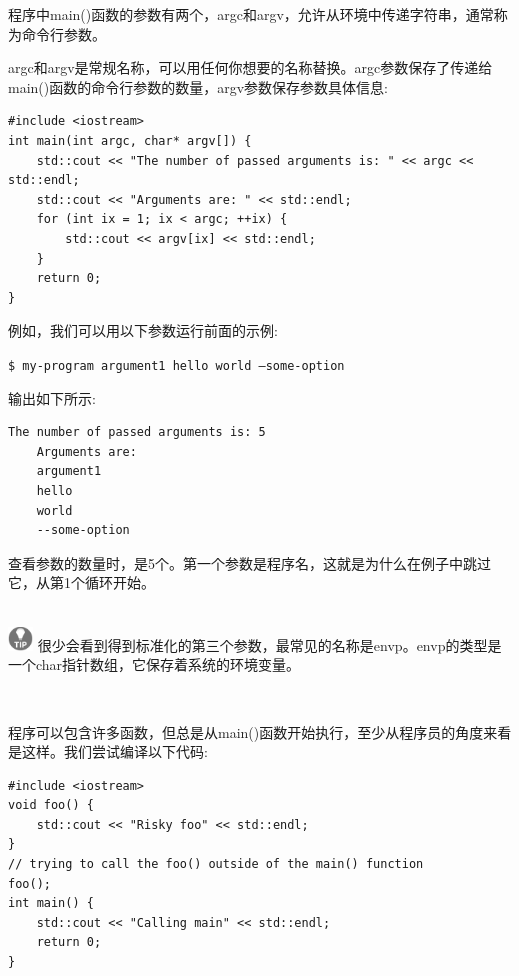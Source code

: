 程序中main()函数的参数有两个，argc和argv，允许从环境中传递字符串，通常称为命令行参数。 \par
argc和argv是常规名称，可以用任何你想要的名称替换。argc参数保存了传递给main()函数的命令行参数的数量，argv参数保存参数具体信息: \par

\begin{lstlisting}[caption={}]
#include <iostream>
int main(int argc, char* argv[]) {
	std::cout << "The number of passed arguments is: " << argc << std::endl;
	std::cout << "Arguments are: " << std::endl;
	for (int ix = 1; ix < argc; ++ix) {
		std::cout << argv[ix] << std::endl;
	}
	return 0;
}
\end{lstlisting}

例如，我们可以用以下参数运行前面的示例: \par

\texttt{\$ my-program argument1 hello world --some-option}

输出如下所示:

\begin{lstlisting}[caption={}]
	The number of passed arguments is: 5 
	Arguments are: 
	argument1 
	hello 
	world 
	--some-option 
\end{lstlisting}

查看参数的数量时，是5个。第一个参数是程序名，这就是为什么在例子中跳过它，从第1个循环开始。 \par

\hspace*{\fill} \\ %
\includegraphics[width=0.05\textwidth]{images/tip}
很少会看到得到标准化的第三个参数，最常见的名称是envp。envp的类型是一个char指针数组，它保存着系统的环境变量。 \par

\noindent\textbf{}\ \par
程序可以包含许多函数，但总是从main()函数开始执行，至少从程序员的角度来看是这样。我们尝试编译以下代码: \par

\begin{lstlisting}[caption={}]
#include <iostream>
void foo() {
	std::cout << "Risky foo" << std::endl;
}
// trying to call the foo() outside of the main() function
foo();
int main() {
	std::cout << "Calling main" << std::endl;
	return 0;
}
\end{lstlisting}

